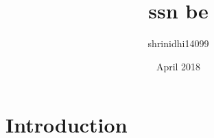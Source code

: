 \documentclass{article}
\title{ssn be}
\author{shrinidhi14099 }
\date{April 2018}
\begin{document}
\maketitle

\section{Introduction}
\end{document}
